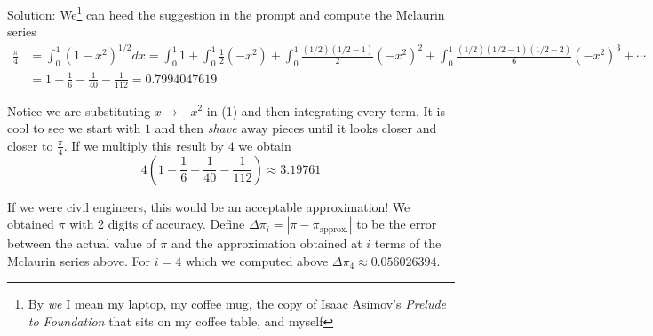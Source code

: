 \documentclass[10pt]{article}
\newcommand{\solution}{\color{blue} Solution: \color{black}}
\begin{document}
\begin{enumerate}
\begin{enumerate}
            \solution We\footnote{By \textit{we} I mean my laptop, my coffee mug, the copy of Isaac Asimov's \textit{Prelude to Foundation} that sits on my coffee table, and myself} can heed the suggestion in the prompt and compute the Mclaurin series  
            \begin{align*}
                \frac{\pi}{4} &= \int_0^1 (1-x^2)^{1/2}dx = \int_0^1 1 + \int_0^1 \frac{1}{2}(-x^2) + \int_0^1 \frac{(1/2)(1/2-1)}{2} (-x^2)^2 + \int_0^1 \frac{(1/2)(1/2-1)(1/2-2)}{6}(-x^2)^3 + \cdots\\
                              &= 1 - \frac{1}{6} - \frac{1}{40} - \frac{1}{112} = 0.7994047619
            \end{align*}

            Notice we are substituting $x \to -x^2$ in (1) and then integrating every term. It is cool to see we start with $1$ and then \textit{shave} away pieces until it looks closer and closer to $\frac{\pi}{4}$. If we multiply this result by $4$ we obtain
            \[4 \left(1 - \frac{1}{6} - \frac{1}{40} - \frac{1}{112}\right) \approx 3.19761\]

            If we were civil engineers, this would be an acceptable approximation! We obtained $\pi$ with 2 digits of accuracy. Define $\Delta \pi_i = |\pi - \pi_{\text{approx.}}|$ to be the error between the actual value of $\pi$ and the approximation obtained at $i$ terms of the Mclaurin series above. For $i = 4$ which we computed above $\Delta \pi_4 \approx 0.056026394$.\\


\end{enumerate}
\end{enumerate}
\end{document}
